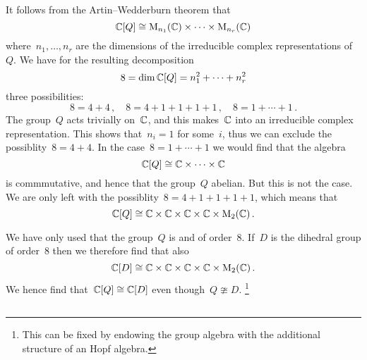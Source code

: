 \section{}





\subsection{}

It follows from the Artin--Wedderburn theorem that
\[
  \mathbb{C}[Q]
  \cong
  \operatorname{M}_{n_1}(\mathbb{C}) \times \dotsb \times \operatorname{M}_{n_r}(\mathbb{C})
\]
where~$n_1, \dotsc, n_r$ are the dimensions of the irreducible complex representations of~$Q$.
We have for the resulting decomposition
\[
  8
  =
  \dim \mathbb{C}[Q]
  =
  n_1^2 + \dotsb + n_r^2
\]
three possibilities:
\[
  8
  =
  4 + 4 \,,
  \quad
  8
  =
  4 + 1 + 1 + 1 + 1 \,,
  \quad
  8
  =
  1 + \dotsb + 1  \,.
\]
The group~$Q$ acts trivially on~$\mathbb{C}$, and this makes~$\mathbb{C}$ into an irreducible complex representation.
This shows that~$n_i = 1$ for some~$i$, thus we can exclude the possiblity~$8 = 4 + 4$.
In the case~$8 = 1 + \dotsb + 1$ we would find that the algebra
\[
  \mathbb{C}[Q]
  \cong
  \mathbb{C}
  \times
  \dotsb
  \times
  \mathbb{C}
\]
is commmutative, and hence that the group~$Q$ abelian.
But this is not the case.
We are only left with the possiblity~$8 = 4 + 1 + 1 + 1 + 1$, which means that
\[
  \mathbb{C}[Q]
  \cong
  \mathbb{C}
  \times
  \mathbb{C}
  \times
  \mathbb{C}
  \times
  \mathbb{C}
  \times
  \operatorname{M}_{2}(\mathbb{C}) \,.
\]


\begin{remark}
  We have only used that the group~$Q$ is  and of order~$8$.
  If~$D$ is the dihedral group of order~$8$ then we therefore find that also
  \[
    \mathbb{C}[D]
    \cong
    \mathbb{C}
    \times
    \mathbb{C}
    \times
    \mathbb{C}
    \times
    \mathbb{C}
    \times
    \operatorname{M}_{2}(\mathbb{C}) \,.
  \]
  We hence find that~$\mathbb{C}[Q] \cong \mathbb{C}[D]$ even though~$Q \ncong D$.%
  \footnote{This can be fixed by endowing the group algebra with the additional structure of an Hopf algebra.}
\end{remark}





\subsection{}


